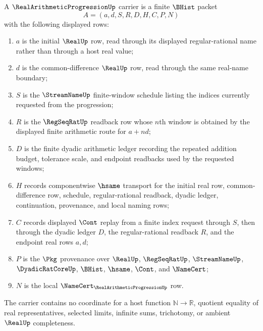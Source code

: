 \begin{definition}
\label{def:real-arithmetic-progression-carrier}
A $\RealArithmeticProgressionUp$ carrier is a finite $\BHist$ packet
$$
A=(a,d,S,R,D,H,C,P,N)
$$
with the following displayed rows:
\begin{enumerate}
\item $a$ is the initial $\RealUp$ row, read through its displayed regular-rational name rather than through a host real value;
\item $d$ is the common-difference $\RealUp$ row, read through the same real-name boundary;
\item $S$ is the $\StreamNameUp$ finite-window schedule listing the indices currently requested from the progression;
\item $R$ is the $\RegSeqRatUp$ readback row whose $n$th window is obtained by the displayed finite arithmetic route for $a+n d$;
\item $D$ is the finite dyadic arithmetic ledger recording the repeated addition budget, tolerance scale, and endpoint readbacks used by the requested windows;
\item $H$ records componentwise $\hsame$ transport for the initial real row, common-difference row, schedule, regular-rational readback, dyadic ledger, continuation, provenance, and local naming rows;
\item $C$ records displayed $\Cont$ replay from a finite index request through $S$, then through the dyadic ledger $D$, the regular-rational readback $R$, and the endpoint real rows $a,d$;
\item $P$ is the $\Pkg$ provenance over $\RealUp$, $\RegSeqRatUp$, $\StreamNameUp$, $\DyadicRatCoreUp$, $\BHist$, $\hsame$, $\Cont$, and $\NameCert$;
\item $N$ is the local $\NameCert_{\RealArithmeticProgressionUp}$ row.
\end{enumerate}
The carrier contains no coordinate for a host function $\mathbb N\to\mathbb R$, quotient equality of real representatives, selected limits, infinite sums, trichotomy, or ambient $\RealUp$ completeness.
\end{definition}


